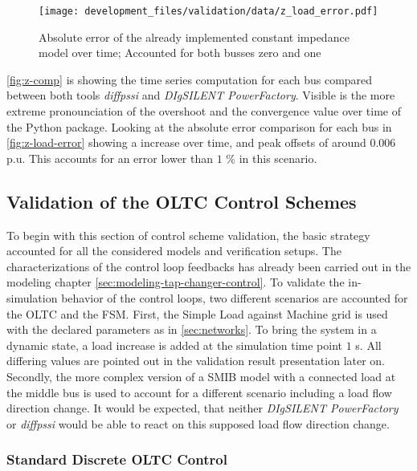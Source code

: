 \begin{figure}[htbp!]
    \centering
    \texttt{[image: development\_files/validation/data/z\_load\_error.pdf]}
    \caption[Absolute error comparison of the constant impedance model]{Absolute error of the already implemented constant impedance model over time; Accounted for both busses zero and one}
    \label{fig:z-load-error}
\end{figure}

\autoref{fig:z-comp} is showing the time series computation for each bus compared between both tools \textit{diffpssi} and \textit{DIgSILENT PowerFactory}.
Visible is the more extreme pronounciation of the overshoot and the convergence value over time of the Python package.
Looking at the absolute error comparison for each bus in \autoref{fig:z-load-error} showing a increase over time, and peak offsets of around $0.006$ p.u.
This accounts for an error lower than $1$ \% in this scenario.

\subsection{Validation of the OLTC Control Schemes}
\label{sec:validation-oltc-schemes}

To begin with this section of control scheme validation, the basic strategy accounted for all the considered models and verification setups.
The characterizations of the control loop feedbacks has already been carried out in the modeling chapter \autoref{sec:modeling-tap-changer-control}.
To validate the in-simulation behavior of the control loops, two different scenarios are accounted for the \acs{OLTC} and the \acs{FSM}.
First, the Simple Load against Machine grid is used with the declared parameters as in \autoref{sec:networks}.
To bring the system in a dynamic state, a load increase is added at the simulation time point $1$ s.
All differing values are pointed out in the validation result presentation later on.
Secondly, the more complex version of a \acs{SMIB} model with a connected load at the middle bus is used to account for a different scenario including a load flow direction change.
It would be expected, that neither \textit{DIgSILENT PowerFactory} or \textit{diffpssi} would be able to react on this supposed load flow direction change.

\subsubsection{Standard Discrete OLTC Control}

